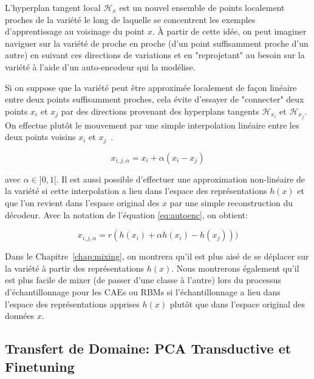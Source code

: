 L'hyperplan tangent local $\mathcal{H}_{x}$ est un nouvel ensemble de points
localement proches de la variété le long de laquelle se concentrent les
exemples d'apprentissage au voisinage du point $x$.  À partir de cette idée, on
peut imaginer naviguer sur la variété de proche en proche (d'un point
suffisamment proche d'un autre) en suivant ces directions de variations et en
"reprojetant" au besoin sur la variété à l'aide d'un auto-encodeur qui la
modélise.

Si on suppose que la variété peut être approximée localement de façon linéaire
entre deux points suffisamment proches, cela évite d'essayer de "connecter"
deux points $x_i$ et $x_j$ par des directions provenant des hyperplans tangents
$\mathcal{H}_{x_i}$ et $\mathcal{H}_{x_j}$. On effectue plutôt le mouvement par une
simple interpolation linéaire entre les deux points voisins $x_{i}$ et $x_{j}$~\citep{Mesnil-et-al-LW2012}.

\begin{equation}
x_{i,j,\alpha} = x_{i} + \alpha (x_{i} - x_{j})
\end{equation}

avec $\alpha \in ]0,1[$. Il est aussi possible d'effectuer une approximation
non-linéaire de la variété si cette interpolation a lieu dans l'espace des
représentations $h(x)$ et que l'on revient dans l'espace original des $x$ par une
simple reconstruction du décodeur. Avec la notation de l'équation
\ref{eq:autoenc}, on obtient:

\begin{equation}
x_{i,j,\alpha} = r(h(x_{i}) + \alpha h(x_{i}) - h(x_{j})))
\end{equation}

Dans le Chapitre~\ref{chap:mixing}, on montrera qu'il est plus aisé de se déplacer sur la
variété à partir des représentations $h(x)$. Nous montrerons également 
qu'il est plus facile de mixer (de passer d'une classe à l'autre)
lors du processus d'échantillonnage pour les CAEs ou RBMs si l'échantillonnage a lieu dans
l'espace des représentations apprises $h(x)$ plutôt que dans l'espace
original des données $x$.

\subsection{Transfert de Domaine: PCA Transductive et Finetuning}

